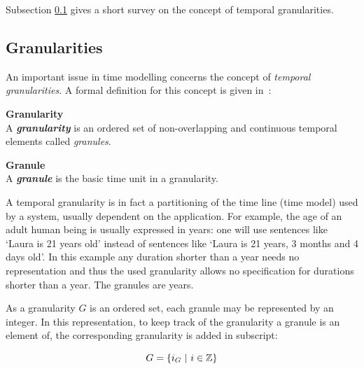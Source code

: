 Subsection \ref{subsec:granularity} gives a short survey on the concept of temporal granularities.

\subsection{Granularities}\label{subsec:granularity}
An important issue in time modelling concerns the concept of \emph{temporal granularities}. A formal definition for this concept is given in~\cite{Lin97}:

\begin{svgraybox}
\vspace{-10pt}
\begin{definition}\textbf{Granularity}~\cite{wang93}\\
A \emph{\textbf{granularity}} is an ordered set of non-overlapping and continuous temporal elements called \emph{granules}.
\end{definition}

\begin{definition}\textbf{Granule}\\
A \textbf{\emph{granule}} is the basic time unit in a granularity.
\end{definition}
\vspace{-10pt}
\end{svgraybox}

A temporal granularity is in fact a partitioning of the time line (time model) used by a system, usually dependent on the application. For example, the age of an adult human being is usually expressed in years: one will use sentences like `Laura is 21 years old' instead of sentences like `Laura is 21 years, 3 months and 4 days old'. In this example any duration shorter than a year needs no representation and thus the used granularity allows no specification for durations shorter than a year. The granules are years.

As a granularity $G$ is an ordered set, each granule may be represented by an integer. In this representation, to keep track of the granularity a granule is an element of, the corresponding granularity is added in subscript:

\begin{equation}
G = \left\{i_{G}\ |\ i \in \mathbb{Z} \right\}
\end{equation}



